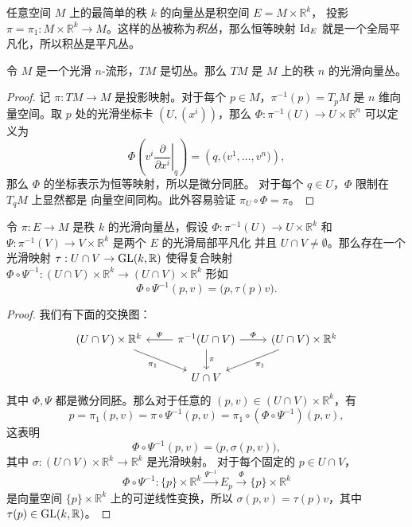 \begin{example}[积丛]
  任意空间 $M$ 上的最简单的秩 $k$ 的向量丛是积空间 $E=M\times \mathbb{R}^k$，
  投影 $\pi=\pi_1:M\times \mathbb{R}^k\to M$。这样的丛被称为\emph{积丛}，那么恒等映射
  $\operatorname{Id}_E$ 就是一个全局平凡化，所以积丛是平凡丛。
\end{example}

\begin{proposition}[切丛作为向量丛]
  令 $M$ 是一个光滑 $n$-流形，$TM$ 是切丛。那么
  $TM$ 是 $M$ 上的秩 $n$ 的光滑向量丛。
\end{proposition}
\begin{proof}
  记 $\pi:TM\to M$ 是投影映射。对于每个 $p\in M$，$\pi^{-1}(p)=T_pM$
  是 $n$ 维向量空间。取 $p$ 处的光滑坐标卡 $(U,(x^i))$，那么
  $\varPhi:\pi^{-1}(U)\to U\times \mathbb{R}^n$ 可以定义为
  \[
    \varPhi\left(v^i\left.\frac{\partial}{\partial x^i}\right|_q\right) 
    =\left(q,\bigl(v^1,\dots,v^n\bigr)\right),
  \]
  那么 $\varPhi$ 的坐标表示为恒等映射，所以是微分同胚。
  对于每个 $q\in U$，$\varPhi$ 限制在 $T_qM$ 上显然都是
  向量空间同构。此外容易验证 $\pi_U\circ \varPhi=\pi$。
\end{proof}
 
\begin{lemma}
  令 $\pi:E\to M$ 是秩 $k$ 的光滑向量丛，假设 $\varPhi:\pi^{-1}(U)\to U\times \mathbb{R}^k$
  和 $\varPsi:\pi^{-1}(V)\to V\times \mathbb{R}^k$ 是两个 $E$ 的光滑局部平凡化
  并且 $U\cap V\neq\emptyset$。那么存在一个光滑映射 $\tau:U\cap V\to \operatorname{GL}(k,\mathbb{R})$
  使得复合映射 $\varPhi\circ\varPsi^{-1}:(U\cap V)\times \mathbb{R}^k\to (U\cap V)\times \mathbb{R}^k$
  形如
  \[
    \varPhi\circ\varPsi^{-1}(p,v)=\bigl(p,\tau(p)v\bigr)  .
  \]
\end{lemma}
\begin{proof}
  我们有下面的交换图：
  \[
    \begin{tikzcd}[column sep=2.4em]
      (U\cap V)\times \mathbb{R}^k\arrow[dr,"\pi_1"']
      &
      \pi^{-1}(U\cap V)\arrow[l,"\varPsi"']\arrow[r,"\varPhi"]\arrow[d,"\pi"]
      &
      (U\cap V)\times \mathbb{R}^k\arrow[dl,"\pi_1"]\\
      & 
      U\cap V
      &
    \end{tikzcd}  
  \]
  其中 $\varPhi,\varPsi$ 都是微分同胚。那么对于任意的
  $(p,v)\in(U\cap V)\times \mathbb{R}^k$，有
  \[
    p=\pi_1(p,v)=\pi\circ\varPsi^{-1}(p,v)=\pi_1\circ(\varPhi\circ\varPsi^{-1})
    (p,v),  
  \]
  这表明
  \[
    \varPhi\circ\varPsi^{-1}(p,v)=\bigl(p,\sigma(p,v)\bigr),
  \]
  其中 $\sigma:(U\cap V)\times \mathbb{R}^k\to \mathbb{R}^k$ 是光滑映射。
  对于每个固定的 $p\in U\cap V$，
  \[ 
    \varPhi\circ\varPsi^{-1}:\{p\}\times \mathbb{R}^k\xrightarrow{\varPsi^{-1}}
    E_p\xrightarrow{\varPhi}\{p\}\times \mathbb{R}^k
  \]
  是向量空间 $\{p\}\times \mathbb{R}^k$ 上的可逆线性变换，所以
  $\sigma(p,v)=\tau(p)v$，其中 $\tau(p)\in\operatorname{GL}(k,\mathbb{R})$。
\end{proof}

